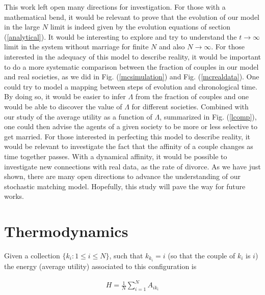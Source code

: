 \documentclass[12pt]{article}
\begin{document}
This work left open many directions for investigation. For those with a mathematical bend, it would be relevant to prove that the evolution of our model in the large $N$ limit is indeed given by the evolution equations of section (\ref{analytical}). It would be interesting to explore and try to understand the $t\rightarrow\infty$ limit in the system without marriage for finite $N$ and also $N\rightarrow\infty$. For those interested in the adequacy of this model to describe reality, it would be important to do a more systematic comparison between the fraction of couples in our model and real societies, as we did in Fig. (\ref{mcsimulation}) and Fig. (\ref{mcrealdata}). One could try to model a mapping between steps of evolution and chronological time. By doing so, it would be easier to infer $\Lambda$ from the fraction of couples and one would be able to discover the value of $\Lambda$ for different societies. Combined with our study of the average utility as a function of $\Lambda$, summarized in Fig. (\ref{lcomp}), one could then advise the agents of a given society to be more or less selective to get married. For those interested in perfecting this model to describe reality, it would be relevant to investigate the fact that the affinity of a couple changes as time together passes. With a dynamical affinity, it would be possible to investigate new connections with real data, as the rate of divorce. %
As we have just shown, there are many open directions to advance the understanding of our stochastic matching model. Hopefully, this study will pave the way for future works.

\section{Thermodynamics} Given a collection $\{k_i:1\leq i\leq N\}$, such that $k_{k_i}=i$ (so that the couple of $k_i$ is $i$) the energy (average utility) associated to this configuration is

\begin{align}
    H=\frac{1}{N}\sum_{i=1}^NA_{ik_i}
\end{align}
\end{document}
